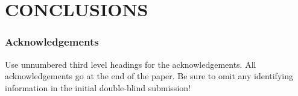 \documentclass[twoside]{article}
\begin{document}
\section{CONCLUSIONS}
\label{sec:conc}


\subsubsection*{Acknowledgements}

Use unnumbered third level headings for the acknowledgements.  All
acknowledgements go at the end of the paper.  Be sure to omit any
identifying information in the initial double-blind submission!
\fi




\end{document}
